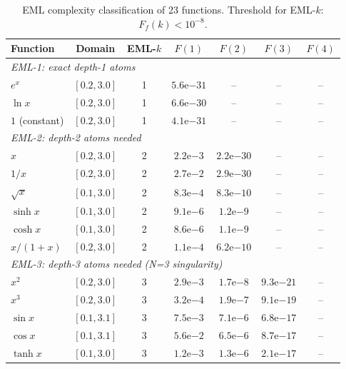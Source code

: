\begin{table}[h]
\centering
\caption{EML complexity classification of 23 functions.
  Threshold for EML-$k$: $F_f(k) < 10^{-8}$.}
\label{tab:census}
\begin{tabular}{lcccccc}
\hline
\textbf{Function} & \textbf{Domain} & \textbf{EML-$k$} &
$F(1)$ & $F(2)$ & $F(3)$ & $F(4)$ \\
\hline
\multicolumn{7}{l}{\emph{EML-1: exact depth-1 atoms}} \\
$e^x$             & $[0.2, 3.0]$ & 1 & $5.6\mathrm{e}{-31}$ & -- & -- & -- \\
$\ln x$           & $[0.2, 3.0]$ & 1 & $6.6\mathrm{e}{-30}$ & -- & -- & -- \\
$1$ (constant)    & $[0.2, 3.0]$ & 1 & $4.1\mathrm{e}{-31}$ & -- & -- & -- \\
\hline
\multicolumn{7}{l}{\emph{EML-2: depth-2 atoms needed}} \\
$x$               & $[0.2, 3.0]$ & 2 & $2.2\mathrm{e}{-3}$ & $2.2\mathrm{e}{-30}$ & -- & -- \\
$1/x$             & $[0.2, 3.0]$ & 2 & $2.7\mathrm{e}{-2}$ & $2.9\mathrm{e}{-30}$ & -- & -- \\
$\sqrt{x}$        & $[0.1, 3.0]$ & 2 & $8.3\mathrm{e}{-4}$ & $8.3\mathrm{e}{-10}$ & -- & -- \\
$\sinh x$         & $[0.1, 3.0]$ & 2 & $9.1\mathrm{e}{-6}$ & $1.2\mathrm{e}{-9}$ & -- & -- \\
$\cosh x$         & $[0.1, 3.0]$ & 2 & $8.6\mathrm{e}{-6}$ & $1.1\mathrm{e}{-9}$ & -- & -- \\
$x/(1+x)$         & $[0.2, 3.0]$ & 2 & $1.1\mathrm{e}{-4}$ & $6.2\mathrm{e}{-10}$ & -- & -- \\
\hline
\multicolumn{7}{l}{\emph{EML-3: depth-3 atoms needed (N=3 singularity)}} \\
$x^2$             & $[0.2, 3.0]$ & 3 & $2.9\mathrm{e}{-3}$ & $1.7\mathrm{e}{-8}$ & $9.3\mathrm{e}{-21}$ & -- \\
$x^3$             & $[0.2, 3.0]$ & 3 & $3.2\mathrm{e}{-4}$ & $1.9\mathrm{e}{-7}$ & $9.1\mathrm{e}{-19}$ & -- \\
$\sin x$          & $[0.1, 3.1]$ & 3 & $7.5\mathrm{e}{-3}$ & $7.1\mathrm{e}{-6}$ & $6.8\mathrm{e}{-17}$ & -- \\
$\cos x$          & $[0.1, 3.1]$ & 3 & $5.6\mathrm{e}{-2}$ & $6.5\mathrm{e}{-6}$ & $8.7\mathrm{e}{-17}$ & -- \\
$\tanh x$         & $[0.1, 3.0]$ & 3 & $1.2\mathrm{e}{-3}$ & $1.3\mathrm{e}{-6}$ & $2.1\mathrm{e}{-17}$ & -- \\

\end{tabular}
\end{table}
